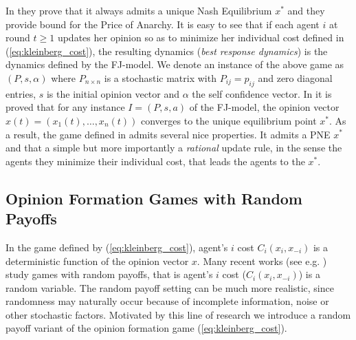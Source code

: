 \noindent In \cite{BK011} they prove that it always admits a unique
Nash Equilibrium $x^*$ and they provide bound for the Price of Anarchy.
It is easy to see that if each agent $i$ at round $t \geq 1$ updates her opinion so as to minimize her
individual cost defined in (\ref{eq:kleinberg_cost}), the resulting dynamics (\emph{best response dynamics}) 
is the dynamics defined by the FJ-model. We denote an instance of the above game as $(P,s,\alpha)$ where
$P_{n \times n}$ is a stochastic matrix with $P_{ij}=p_{ij}$ and zero diagonal entries, $s$ is the initial 
opinion vector and $\alpha$ the self confidence vector. In \cite{GS14} it is proved that for any instance $I=(P,s,a)$ of the FJ-model, the opinion
vector $x(t)=(x_1(t),\ldots,x_n(t))$ converges to the unique equilibrium point
$x^*$. As a result, the game defined in \cite{BKO11} admits several nice properties. It admits
a PNE $x^*$ and that a simple but more importantly a \emph{rational} update rule, 
in the sense the agents they minimize their individual cost, that leads the agents to 
the $x^*$.

\subsection{Opinion Formation Games with Random Payoffs}
In the game defined by (\ref{eq:kleinberg_cost}),
agent's $i$ cost $C_i(x_i,x_{-i})$ is a deterministic function of the
opinion vector $x$. Many recent works (see e.g. \cite{Zhou17}) study games
with random payoffs, that is agent's $i$ cost ($C_i(x_i,x_{-i})$) is a
random variable. The random payoff setting can be much more realistic,
since randomness may naturally occur because of incomplete information, noise
or other stochastic factors. Motivated by this
line of research we introduce a random payoff variant of the opinion
formation game (\ref{eq:kleinberg_cost}).

